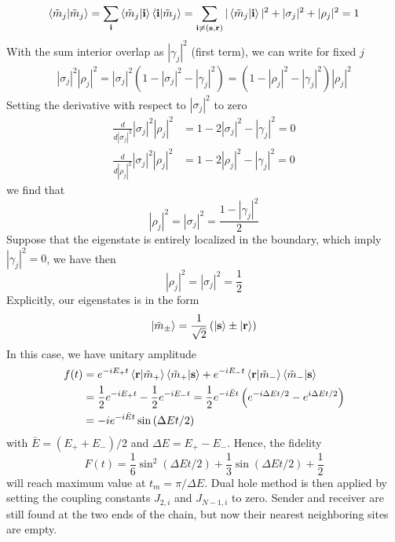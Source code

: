 \documentclass[../../../main.tex]{subfiles}
\begin{document}
\begin{equation*}
  \braket{\tilde{m}_j  | \tilde{m}_j }
  = \sum_{ \mathbf{i} }  \braket{\tilde{m}_j  | \mathbf{i } } \braket{\mathbf{i }  | \tilde{m}_j }
  = \sum_{\mathbf{i} \neq (\mathbf{s},\mathbf{r})}  |\braket{\tilde{m}_j  | \mathbf{i }}|^2 + |\sigma_j|^2 + |\rho_j|^2 = 1
\end{equation*}
With the sum interior overlap as $|\gamma_j|^2$ (first term), we can write for fixed $j$
\begin{align*}
  |\sigma_j|^2|\rho_j|^2 = |\sigma_j|^2 \left( 1 - |\sigma_j|^2 -  |\gamma_j|^2\right)
  = \left( 1 - |\rho_j|^2 -  |\gamma_j|^2\right) |\rho_j|^2
\end{align*}
Setting the derivative with respect to $|\sigma_j|^2$ to zero
\begin{align*}
  \frac{d }{d|\sigma_j|^2} |\sigma_j|^2|\rho_j|^2 & =  1 - 2|\sigma_j|^2 -|\gamma_j|^2 = 0 \\
  \frac{d }{d|\rho_j|^2} |\sigma_j|^2|\rho_j|^2   & =  1 - 2|\rho_j|^2 -|\gamma_j|^2 = 0
\end{align*}
we find that
\begin{equation*}
  |\rho_j|^2 = |\sigma_j|^2 = \frac{1 - |\gamma_j |^2}{2}
\end{equation*}
Suppose that the eigenstate is entirely localized in the boundary, which imply $|\gamma_j|^2=0$, we have then
\begin{equation*}
  |\rho_j|^2 = |\sigma_j|^2 = \frac{1 }{2 }
\end{equation*}
Explicitly, our eigenstates is in the form
\begin{equation*}
  \ket{\tilde{m}_\pm} = \frac{1 }{\sqrt{2}} \left( \ket{\mathbf{s }} \pm \ket{\mathbf{r}} \right)
\end{equation*}
In this case, we have unitary amplitude
\begin{align*}
  f(t) & =
  e ^{-i E_+ t} \braket{\mathbf{r } |\tilde{m}_+ } \braket{\tilde{m}_+  | \mathbf{s}} +
  e ^{-i E_- t} \braket{\mathbf{r } |\tilde{m}_- } \braket{\tilde{m}_-  | \mathbf{s}}                                                              \\
       & = \frac{1 }{2 }e ^{-i E_+ t} - \frac{1 }{2} e ^{-i E_- t} = \frac{1}{2} e^{-i \bar{E} t}\left(e^{-i\Delta E t/2}-e^{i\Delta E t/2}\right) \\
       & = - i e ^{-i \bar{E} t}\sin \left( \Delta E t /2 \right)
\end{align*}
with $\bar{E} = (E_++E_-)/2$ and $\Delta E = E_+ - E_-$.
Hence, the fidelity
\begin{equation*}
  F(t) = \frac{1 }{6 } \sin^2 \left( \Delta E t /2 \right) + \frac{1 }{3 }\sin \left( \Delta E t /2 \right) + \frac{1 }{2 }
\end{equation*}
will reach maximum value at $t_m = \pi/\Delta E$.
Dual hole method is then applied by setting the coupling constants $J_{2,i}$ and $J_{N-1,i}$ to zero.
Sender and receiver are still found at the two ends of the chain, but now their nearest neighboring sites are empty.
\end{document}

